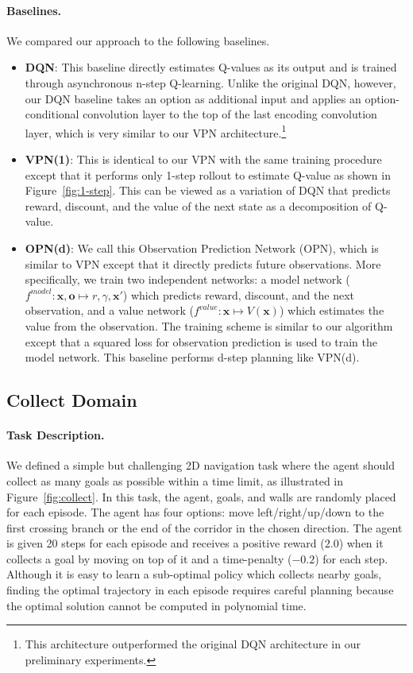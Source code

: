 \documentclass{article}
\newcommand{\option}{o}
\newcommand{\cutsubsectionup}{\vspace*{-0.04in}}
\newcommand{\cutsubsectiondown}{\vspace*{-0.03in}}
\newcommand{\cutparagraphup}{\vspace{-2pt}}
\begin{document}
\cutparagraphup
\paragraph{Baselines.} We compared our approach to the following baselines.
\begin{itemize}[leftmargin=*]
\item \textbf{DQN}: This baseline directly estimates Q-values as its output and is trained through asynchronous n-step Q-learning. Unlike the original DQN, however, our DQN baseline takes an option as additional input and applies an option-conditional convolution layer to the top of the last encoding convolution layer, which is very similar to our VPN architecture.\footnote{This architecture outperformed the original DQN architecture in our preliminary experiments.} 
\item \textbf{VPN(1)}: This is identical to our VPN with the same training procedure except that it performs only 1-step rollout to estimate Q-value as shown in Figure~\ref{fig:1-step}. This can be viewed as a variation of DQN that predicts reward, discount, and the value of the next state as a decomposition of Q-value.
\item \textbf{OPN(d)}: We call this Observation Prediction Network (OPN), which is similar to VPN except that it directly predicts future observations. More specifically, we train two independent networks: a model network ($f^{model}: \textbf{x},\textbf{\option{}} \mapsto r,\gamma,\textbf{x}'$) which predicts reward, discount, and the next observation, and a value network ($f^{value}:\textbf{x} \mapsto V(\textbf{x})$) which estimates the value from the observation. The training scheme is similar to our algorithm except that a squared loss for observation prediction is used to train the model network. This baseline performs d-step planning like VPN(d). \end{itemize}



\cutsubsectionup
\subsection{Collect Domain} \label{exp:collect}
\cutsubsectiondown

\paragraph{Task Description.}
We defined a simple but challenging 2D navigation task where the agent should collect as many goals as possible within a time limit, as illustrated in Figure~\ref{fig:collect}. In this task, the agent, goals, and walls are randomly placed for each episode. The agent has four options: move left/right/up/down to the first crossing branch or the end of the corridor in the chosen direction. The agent is given 20 steps for each episode and receives a positive reward ($2.0$) when it collects a goal by moving on top of it and a time-penalty ($-0.2$) for each step. Although it is easy to learn a sub-optimal policy which collects nearby goals, finding the optimal trajectory in each episode requires careful planning because the optimal solution cannot be computed in polynomial time.
\end{document}
